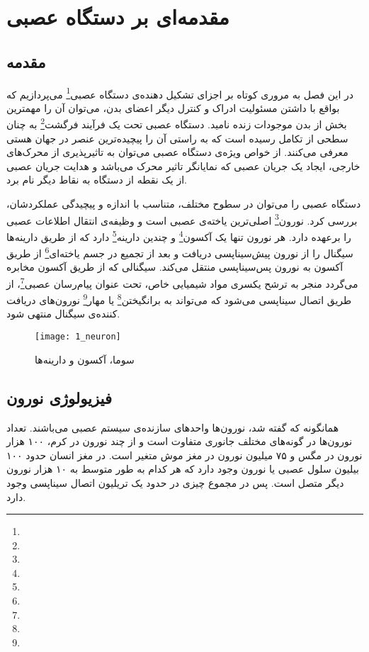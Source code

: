 \chapter{مقدمه‌ای بر دستگاه عصبی}
\section{مقدمه}
در این فصل به مروری کوتاه بر اجزای تشکیل دهنده‌ی دستگاه عصبی\footnote{} می‌پردازیم که بواقع با داشتن مسئولیت ادراک و کنترل دیگر اعضای بدن، می‌توان آن را مهمترین بخش از بدن موجودات زنده نامید. 
دستگاه عصبی تحت یک فرآیند فرگشت\footnote{} به چنان سطحی از تکامل رسیده است که به راستی آن را پیچیده‌ترین عنصر در جهان هستی معرفی می‌کنند. از خواص ویژه‌ی دستگاه عصبی می‌توان به تاثیر‌پذیری از محرک‌های خارجی، ایجاد یک جریان عصبی که نمایانگر تاثیر محرک می‌باشد و هدایت جریان عصبی از یک نقطه از دستگاه به نقاط دیگر نام برد.

دستگاه عصبی را می‌توان در سطوح مختلف، متناسب با اندازه و پیچیدگی عملکردشان، بررسی کرد. 
نورون\footnote{} اصلی‌ترین یاخته‌ی عصبی است و وظیفه‌ی انتقال اطلاعات عصبی را برعهده دارد. هر نورون تنها یک آکسون\footnote{} و چندین دارینه\footnote{} دارد که از طریق دارینه‌ها سیگنال را از نورون پیش‌سیناپسی دریافت و بعد از تجمیع در جسم یاخته‌ای\footnote{} از طریق آکسون به نورون پس‌سیناپسی منتقل می‌کند. سیگنالی که از طریق آکسون مخابره می‌گردد منجر به ترشح یکسری مواد شیمیایی خاص، تحت عنوان پیام‌رسان عصبی\footnote{}، از طریق اتصال سیناپسی می‌شود که می‌تواند به برانگیختن\footnote{} یا مهار\footnote{} نورون‌های دریافت کننده‌ی سیگنال منتهی شود. 

\begin{figure}
\centering
{\footnotesize
\texttt{[image: 1\_neuron]}
\caption{سوما، آکسون و دارینه‌ها}
\label{fig:1_neuron}
}
\end{figure}

\section{فیزیولوژی نورون}
همانگونه که گفته شد، نورون‌ها واحدهای سازنده‌ی سیستم عصبی می‌باشند. تعداد نورون‌ها در گونه‌های مختلف جانوری متفاوت است و از چند نورون در کرم، ۱۰۰ هزار نورون در مگس و ۷۵ میلیون نورون در مغز موش متغیر است. در مغز انسان حدود ۱۰۰ بیلیون سلول عصبی یا نورون وجود دارد که هر کدام به طور متوسط به ۱۰ هزار نورون دیگر متصل است. پس در مجموع چیزی در حدود یک تریلیون اتصال سیناپسی وجود دارد.

